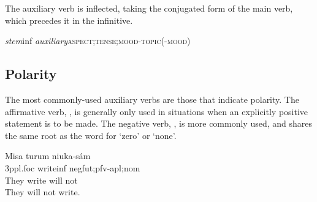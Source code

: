 \documentclass[grammar]{subfiles}
\begin{document}
  The auxiliary verb is inflected, taking the conjugated form of the main verb, which precedes it in the infinitive.

  \begin{exe}
    \ex\label{exe:vm_auxiliary_conjugation} \textit{stem}\bs\acs{inf} \textit{auxiliary}\bs\textsc{aspect;tense;mood-topic(-mood)}
  \end{exe}

  \subsection{Polarity}
  \label{ssec:vm_polarity}

  The most commonly-used auxiliary verbs are those that indicate polarity. The affirmative verb, , is generally only used in situations when an explicitly positive statement is to be made. The negative verb, , is more commonly used, and shares the same root as the word for ‘zero’ or ‘none’.

  \begin{exe}
    \ex {}
    \glll Misa turum niuka-sám\\
    \acs{3p}\acs{pl}.\acs{foc} write\bs\acs{inf} \acs{neg}\bs\acs{fut};\acs{pfv}-\acs{apl};\acs{nom}\\
    {They} {write} {will not}\\
    \glt They will not write.
  \end{exe}


\end{document}
